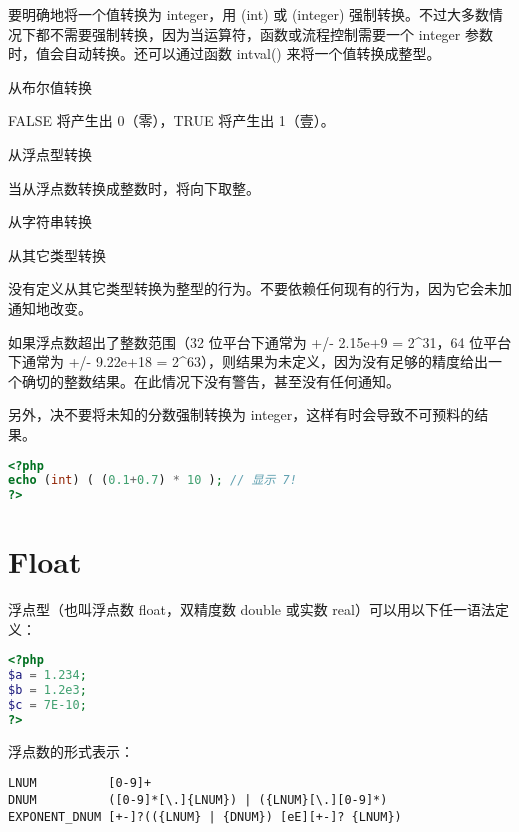 要明确地将一个值转换为 integer，用 (int) 或 (integer) 强制转换。不过大多数情况下都不需要强制转换，因为当运算符，函数或流程控制需要一个 integer 参数时，值会自动转换。还可以通过函数 intval() 来将一个值转换成整型。

\begin{compactitem}
\item 从布尔值转换

FALSE 将产生出 0（零），TRUE 将产生出 1（壹）。

\item 从浮点型转换

当从浮点数转换成整数时，将向下取整。

\item 从字符串转换

\item 从其它类型转换

没有定义从其它类型转换为整型的行为。不要依赖任何现有的行为，因为它会未加通知地改变。



\end{compactitem}


如果浮点数超出了整数范围（32 位平台下通常为 +/- 2.15e+9 = 2\^{}31，64 位平台下通常为 +/- 9.22e+18 = 2\^{}63），则结果为未定义，因为没有足够的精度给出一个确切的整数结果。在此情况下没有警告，甚至没有任何通知。

另外，决不要将未知的分数强制转换为 integer，这样有时会导致不可预料的结果。

\begin{lstlisting}[language=PHP]
<?php
echo (int) ( (0.1+0.7) * 10 ); // 显示 7!
?>
\end{lstlisting}

\section{Float}

浮点型（也叫浮点数 float，双精度数 double 或实数 real）可以用以下任一语法定义：

\begin{lstlisting}[language=PHP]
<?php
$a = 1.234; 
$b = 1.2e3; 
$c = 7E-10;
?>
\end{lstlisting}

浮点数的形式表示：

\begin{verbatim}
LNUM          [0-9]+
DNUM          ([0-9]*[\.]{LNUM}) | ({LNUM}[\.][0-9]*)
EXPONENT_DNUM [+-]?(({LNUM} | {DNUM}) [eE][+-]? {LNUM})
\end{verbatim}


